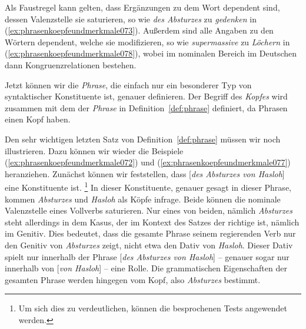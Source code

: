 
Als Faustregel kann gelten, dass Ergänzungen zu dem Wort dependent sind, dessen Valenzstelle sie saturieren, so wie \textit{des Absturzes} zu \textit{gedenken} in (\ref{ex:phrasenkoepfeundmerkmale073}).
Außerdem sind alle Angaben zu den Wörtern dependent, welche sie modifizieren, so wie \textit{supermassive} zu \textit{Löchern} in (\ref{ex:phrasenkoepfeundmerkmale078}), wobei im nominalen Bereich im Deutschen dann Kongruenzrelationen bestehen.

Jetzt können wir die \textit{Phrase}, die einfach nur ein besonderer Typ von syntaktischer Konstituente ist, genauer definieren.
Der Begriff des \textit{Kopfes} wird zusammen mit dem der \textit{Phrase} in Definition~\ref{def:phrase} definiert, da Phrasen einen Kopf haben.


Den sehr wichtigen letzten Satz von Definition~\ref{def:phrase} müssen wir noch illustrieren.
Dazu können wir wieder die Beispiele (\ref{ex:phrasenkoepfeundmerkmale072}) und (\ref{ex:phrasenkoepfeundmerkmale077}) heranziehen.
Zunächst können wir feststellen, dass [\textit{des Absturzes von Hasloh}] eine Konstituente ist.%
\footnote{Um sich dies zu verdeutlichen, können die besprochenen Tests angewendet werden.}
In dieser Konstituente, genauer gesagt in dieser Phrase, kommen \textit{Absturzes} und \textit{Hasloh} als Köpfe infrage.
Beide können die nominale Valenzstelle eines Vollverbs saturieren.
Nur eines von beiden, nämlich \textit{Absturzes} steht allerdings in dem Kasus, der im Kontext des Satzes der richtige ist, nämlich im Genitiv.
Dies bedeutet, dass die gesamte Phrase seinem regierenden Verb nur den Genitiv von \textit{Absturzes} zeigt, nicht etwa den Dativ von \textit{Hasloh}.
Dieser Dativ spielt nur innerhalb der Phrase [\textit{des Absturzes von Hasloh}] -- genauer sogar nur innerhalb von [\textit{von Hasloh}] -- eine Rolle.
Die grammatischen Eigenschaften der gesamten Phrase werden hingegen vom Kopf, also \textit{Absturzes} bestimmt.

